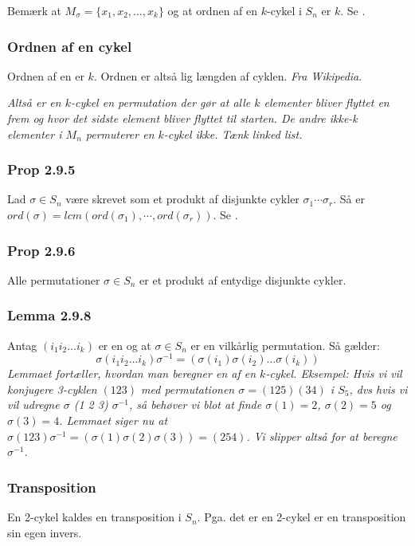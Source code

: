Bemærk at $M_\sigma = \{x_1, x_2, \ldots, x_k \}$ og at ordnen af en $k$-cykel i
$S_n$ er $k$. Se .

\subsubsection{Ordnen af en cykel}
\label{Orden af en cykel}
Ordnen af en  er $k$. Ordnen er altså lig længden af cyklen.
\textit{Fra Wikipedia}.

\textit{Altså er en $k$-cykel en permutation der gør at alle $k$ elementer
bliver flyttet en frem og hvor det sidste element bliver flyttet til starten. De
andre ikke-k elementer i $M_n$ permuterer en $k$-cykel ikke. Tænk linked
list.}
 
\subsubsection{Prop 2.9.5}
Lad $\sigma \in S_n$ være skrevet som et produkt af disjunkte cykler $\sigma_1
\cdots \sigma_r$. Så er $ord(\sigma) = lcm(ord(\sigma_1), \cdots,
ord(\sigma_r))$. Se .

\subsubsection{Prop 2.9.6}
Alle permutationer $\sigma \in S_n$ er et produkt af entydige disjunkte cykler.

\subsubsection{Lemma 2.9.8}
Antag $(i_1 i_2 \ldots i_k)$ er en  og at $\sigma \in
S_n$ er en vilkårlig permutation. Så gælder:
\begin{equation*}
  \sigma(i_1 i_2 \ldots i_k)\sigma^{-1} =
  (\sigma(i_1)\sigma(i_2) \ldots \sigma(i_k))
\end{equation*}
\textit{Lemmaet fortæller, hvordan man beregner en  af en
$k$-cykel. Eksempel: Hvis vi vil konjugere 3-cyklen $(1 2 3)$ med permutationen
$\sigma = (1 2 5)(3 4)$ i $S_5$, dvs hvis vi vil udregne $\sigma$ (1 2 3)
$\sigma^{-1}$, så behøver vi blot at finde $\sigma(1)=2$, $\sigma(2)=5$ og
$\sigma(3)=4$. Lemmaet siger nu at $\sigma (1 2 3) \sigma^{-1} = (\sigma(1)
\sigma(2) \sigma(3)) = (2 5 4)$. Vi slipper altså for at beregne $\sigma^{-1}$.}

\subsubsection{Transposition}
\label{Transposition}
En 2-cykel kaldes en transposition i $S_n$. Pga. det er en 2-cykel er en
transposition sin egen invers.

